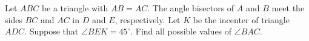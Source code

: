 Let $ABC$ be a triangle with $AB = AC$. The angle bisectors of $A$ and $B$ meet the sides $BC$ and $AC$ in $D$ and $E$, respectively. Let $K$ be the incenter of triangle $ADC$. Suppose that $\angle BEK = 45^{\circ}$. Find all possible values of $\angle BAC$.
